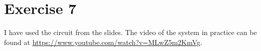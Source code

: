 \part*{Exercise 7}
I have used the circuit from the slides. The video of the system in practice can be found at \url{https://www.youtube.com/watch?v=MLwZ5m2KmVg}.